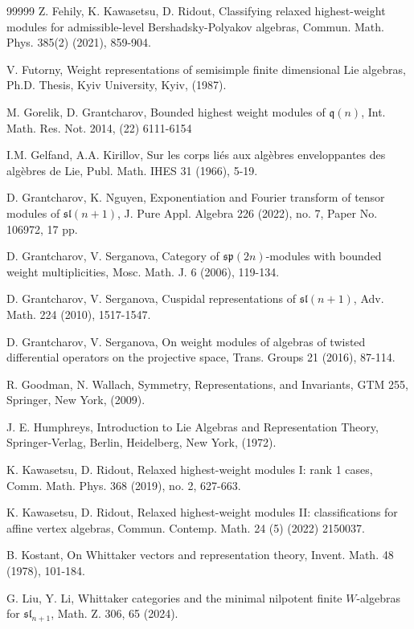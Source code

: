 \documentclass[12pt,a4paper]{amsart}
\numberwithin{equation}{section}
\def\sl{\mathfrak{sl}}
\begin{document}
\begin{thebibliography}{99999}
 Z. Fehily, K. Kawasetsu, D. Ridout, Classifying relaxed highest-weight modules for admissible-level Bershadsky-Polyakov algebras, Commun. Math. Phys. 385(2) (2021), 859-904.

     V. Futorny, Weight representations of semisimple finite dimensional
Lie algebras, Ph.D. Thesis, Kyiv University, Kyiv, (1987).

 M. Gorelik, D. Grantcharov, Bounded highest weight modules of $\mathfrak{q}(n)$, Int. Math. Res. Not. 2014, (22) 6111-6154

    I.M. Gelfand, A.A. Kirillov, Sur les corps li\'es aux alg\`ebres enveloppantes
des alg\`ebres de Lie, Publ. Math. IHES 31 (1966), 5-19.


   D. Grantcharov, K. Nguyen, Exponentiation and Fourier transform of tensor modules of $\sl(n+1)$, J. Pure Appl. Algebra 226 (2022), no. 7, Paper No. 106972, 17 pp.

     D. Grantcharov, V. Serganova, Category of $\mathfrak{sp}(2n)$-modules with bounded weight multiplicities, Mosc. Math. J. 6 (2006), 119-134.


    D. Grantcharov, V. Serganova, Cuspidal representations of $\sl(n+1)$, Adv. Math. 224 (2010), 1517-1547.

    D. Grantcharov, V. Serganova, On weight modules of algebras of twisted differential operators on the projective space, Trans. Groups 21 (2016), 87-114.

 R. Goodman, N. Wallach, Symmetry, Representations, and Invariants, GTM 255, Springer, New York, (2009).

 J. E. Humphreys, Introduction to Lie Algebras and Representation Theory, Springer-Verlag, Berlin,
Heidelberg, New York, (1972).

  K. Kawasetsu, D. Ridout, Relaxed highest-weight modules I: rank 1 cases, Comm. Math. Phys. 368 (2019), no. 2, 627-663.

 K. Kawasetsu, D. Ridout, Relaxed highest-weight modules II: classifications for affine vertex algebras,
Commun. Contemp. Math. 24 (5) (2022) 2150037.

 B. Kostant, On Whittaker vectors and representation theory, Invent. Math. 48 (1978), 101-184.

 G. Liu, Y. Li,   Whittaker  categories and  the minimal nilpotent finite $W$-algebras for  $\mathfrak{sl}_{n+1}$,  Math. Z. 306, 65 (2024).


\end{thebibliography}
\end{document}
